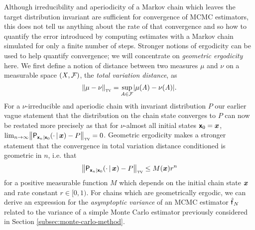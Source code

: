 Although irreducibility and aperiodicity of a Markov chain which leaves the target distribution invariant are sufficient for convergence of \ac{MCMC} estimators, this does not tell us anything about the rate of that convergence and so how to quantify the error introduced by computing estimates with a Markov chain simulated for only a finite number of steps. Stronger notions of ergodicity can be used to help quantify convergence; we will concentrate on \emph{geometric ergodicity} here. We first define a notion of distance between two measures $\mu$ and $\nu$ on a measurable space $(\mathit{X},\mathcal{F})$, the \emph{total variation distance}, as
\begin{equation}\label{eq:total-variation-measures}
  \left\Vert \mu - \nu \right\Vert_{\textsc{tv}} = \sup_{\set{A} \in \sset{F}} \left| \mu(\set{A}) - \nu(\set{A}) \right|.
\end{equation}
For a $\nu$-irreducible and aperiodic chain with invariant distribution $P$ our earlier vague statement that the distribution on the chain state converges to $P$ can now be restated more precisely as that for $\nu$-almost all initial states $\boldsymbol{\mathsf{x}}_0 = \boldsymbol{x}$, $\lim_{n\to\infty} \left\Vert \prob{\rvct{x}_n|\rvct{x}_0}\lpa \cdot \gvn \vct{x}\rpa - \tgtprob \right\Vert_{\textsc{tv}} = 0$. Geometric ergodicity makes a stronger statement that the convergence in total variation distance conditioned is geometric in $n$, i.e. that
\vspace{-2mm}
\begin{equation}\label{eq:geometric-ergodicity}
  \left\Vert \prob{\rvct{x}_n|\rvct{x}_0}\lpa \cdot \gvn \vct{x}\rpa - \tgtprob \right\Vert_{\textsc{tv}} \leq M(\vct{x}) r^n
\end{equation}
for a positive measurable function $M$ which depends on the initial chain state $\boldsymbol{x}$ and rate constant $r \in [0, 1)$. For chains which are geometrically ergodic, we can derive an expression for the \emph{asymptoptic variance} of an \ac{MCMC} estimator $\hatf_N$ related to the variance of a simple Monte Carlo estimator previously considered in Section \ref{subsec:monte-carlo-method}.

